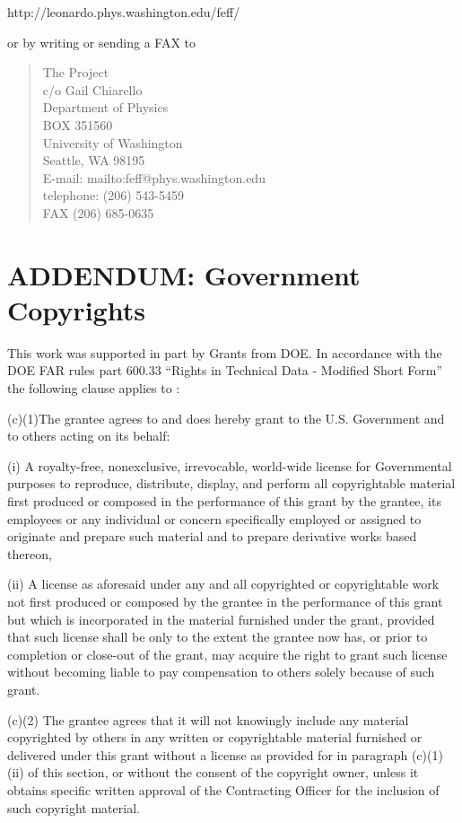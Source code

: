\documentclass[11pt,oneside]{report} %
\begin{document}
\centerline{
  {http://leonardo.phys.washington.edu/feff/}}

\noindent or by writing or sending a FAX to
\begin{quotation}
\noindent The {\feff} Project\\
c/o Gail Chiarello \\
Department of Physics\\
BOX 351560\\
University of Washington\\
Seattle, WA 98195\\[2ex]
E-mail: 
{mailto:feff@phys.washington.edu}\\
telephone: (206) 543-5459 \\
FAX (206) 685-0635
\end{quotation}


\section{ADDENDUM: Government Copyrights}
\label{sec:ADDEND-Governm-Copyr}

This work was supported in part by Grants from DOE. In accordance with
the DOE FAR rules part 600.33 ``Rights in Technical Data - Modified
Short Form'' the following clause applies to {\feff}:

(c)(1)The grantee agrees to and does hereby grant to the U.S.
Government and to others acting on its behalf:

(i) A royalty-free, nonexclusive, irrevocable, world-wide license for
Governmental purposes to reproduce, distribute, display, and perform
all copyrightable material first produced or composed in the
performance of this grant by the grantee, its employees or any
individual or concern specifically employed or assigned to originate
and prepare such material and to prepare derivative works based
thereon,

(ii) A license as aforesaid under any and all copyrighted or
copyrightable work not first produced or composed by the grantee in the
performance of this grant but which is incorporated in the material
furnished under the grant, provided that such license shall be only to
the extent the grantee now has, or prior to completion or close-out of
the grant, may acquire the right to grant such license without becoming
liable to pay compensation to others solely because of such grant.

(c)(2) The grantee agrees that it will not knowingly include any
material copyrighted by others in any written or copyrightable material
furnished or delivered under this grant without a license as provided
for in paragraph (c)(1)(ii) of this section, or without the consent of
the copyright owner, unless it obtains specific written approval of the
Contracting Officer for the inclusion of such copyright material.
\end{document}

